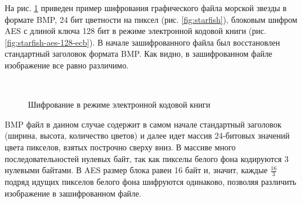На рис. \ref{fig:ecb-demo} приведен пример шифрования графического файла морской звезды в формате BMP, 24 бит цветности на пиксел (рис. \ref{fig:starfish}), блоковым шифром AES с длиной ключа 128 бит в режиме электронной кодовой книги  (рис. \ref{fig:starfish-aes-128-ecb}). В начале зашифрованного файла был восстановлен стандартный заголовок формата BMP. Как видно, в зашифрованном файле изображение все равно различимо.
\begin{figure}[!ht]
    \centering
    ~~~
    \caption{Шифрование в режиме электронной кодовой книги\label{fig:ecb-demo}}
\end{figure}
BMP файл в данном случае содержит в самом начале стандартный заголовок (ширина, высота, количество цветов) и далее идет массив 24-битовых значений цвета пикселов, взятых построчно сверху вниз. В массиве много последовательностей нулевых байт, так как пикселы белого фона кодируются 3 нулевыми байтами. В AES размер блока равен 16 байт и, значит, каждые $\frac{16}{3}$ подряд идущих пикселов белого фона шифруются одинаково, позволяя различить изображение в зашифрованном файле.


